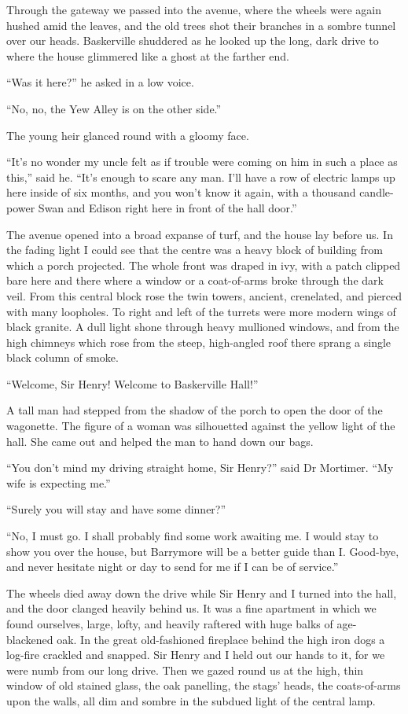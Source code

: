 \documentclass[paper=5.5in:8.5in,BCOR=7mm,twoside,DIV=calc,12pt,usegeometry,openany,chapterprefix,endperiod]{scrbook} %
\begin{document}
Through the gateway we passed into the avenue, where the wheels were again hushed amid the leaves, and the old trees shot their branches in a sombre tunnel over our heads. Baskerville shuddered as he looked up the long, dark drive to where the house glimmered like a ghost at the farther end.

\enquote{Was it here?} he asked in a low voice.

\enquote{No, no, the Yew Alley is on the other side.}

The young heir glanced round with a gloomy face.

\enquote{It's no wonder my uncle felt as if trouble were coming on him in such a place as this,} said he. \enquote{It's enough to scare any man. I'll have a row of electric lamps up here inside of six months, and you won't know it again, with a thousand candle-power Swan and Edison right here in front of the hall door.}

The avenue opened into a broad expanse of turf, and the house lay before us. In the fading light I could see that the centre was a heavy block of building from which a porch projected. The whole front was draped in ivy, with a patch clipped bare here and there where a window or a coat-of-arms broke through the dark veil. From this central block rose the twin towers, ancient, crenelated, and pierced with many loopholes. To right and left of the turrets were more modern wings of black granite. A dull light shone through heavy mullioned windows, and from the high chimneys which rose from the steep, high-angled roof there sprang a single black column of smoke.

\enquote{Welcome, Sir Henry! Welcome to Baskerville Hall!}

A tall man had stepped from the shadow of the porch to open the door of the wagonette. The figure of a woman was silhouetted against the yellow light of the hall. She came out and helped the man to hand down our bags.

\enquote{You don't mind my driving straight home, Sir Henry?} said Dr Mortimer. \enquote{My wife is expecting me.}

\enquote{Surely you will stay and have some dinner?}

\enquote{No, I must go. I shall probably find some work awaiting me. I would stay to show you over the house, but Barrymore will be a better guide than I. Good-bye, and never hesitate night or day to send for me if I can be of service.}

The wheels died away down the drive while Sir Henry and I turned into the hall, and the door clanged heavily behind us. It was a fine apartment in which we found ourselves, large, lofty, and heavily raftered with huge balks of age-blackened oak. In the great old-fashioned fireplace behind the high iron dogs a log-fire crackled and snapped. Sir Henry and I held out our hands to it, for we were numb from our long drive. Then we gazed round us at the high, thin window of old stained glass, the oak panelling, the stags' heads, the coats-of-arms upon the walls, all dim and sombre in the subdued light of the central lamp.
\end{document}
